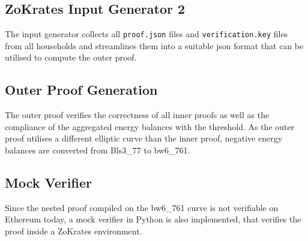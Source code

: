 \subsection{ZoKrates Input Generator 2}
The input generator collects all \texttt{proof.json} files and \texttt{verification.key} files from all households and streamlines them into a suitable json format that can be utilised to compute the outer proof. 

\subsection{Outer Proof Generation}
The outer proof verifies the correctness of all inner proofs as well as the compliance of the aggregated energy balances with the threshold. As the outer proof utilises a different elliptic curve than the inner proof, negative energy balances are converted from Bls3\_77 to bw6\_761.

\subsection{Mock Verifier}

Since the nested proof compiled on the bw6\_761 curve is not verifiable on Ethereum today, a mock verifier in Python is also implemented, that verifies the proof inside a ZoKrates environment. 